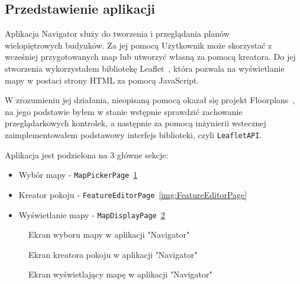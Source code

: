 \subsection{Przedstawienie aplikacji}

Aplikacja Navigator służy do tworzenia i przeglądania planów\\%
wielopiętrowych budynków.
Za jej pomocą Użytkownik może skorzystać z wcześniej przygotowanych map lub utworzyć własną za pomocą kreatora.
Do jej stworzenia wykorzystałem bibliotekę Leaflet~\cite{leafletGithub}, 
która pozwala na wyświetlanie mapy w postaci strony HTML za pomocą JavaScript.

W zrozumieniu jej działania, nieopisaną pomocą okazał się projekt Floorplans~\cite{floorplansGithub},
na jego podstawie byłem w stanie wstępnie sprawdzić zachowanie przeglądarkowych kontrolek, 
a następnie za pomocą inżynierii wstecznej zaimplementowałem podstawowy interfejs biblioteki, 
czyli \verb|LeafletAPI|.

Aplikacja jest podzielona na 3 główne sekcje: 
\begin{itemize}
    \item Wybór mapy - \verb|MapPickerPage|~\ref{img:MapPickerPage}
    \item Kreator pokoju - \verb|FeatureEditorPage|~\ref{img:FeatureEditorPage}
    \item Wyświetlanie mapy - \verb|MapDisplayPage|~\ref{img:MapDisplayPage}
\end{itemize}

\begin{figure}[h]
    \centering
    \caption{Ekran wyboru mapy w aplikacji "Navigator"}
    \label{img:MapPickerPage}
\end{figure}

\begin{figure}[ht]
    \centering
    \begin{minipage}[b]{0.6\textwidth}
      \caption{Ekran kreatora pokoju w aplikacji "Navigator"}
      \label{img:FeatureEditorPage}
    \end{minipage}
    \hfill
    \begin{minipage}[b]{0.39\textwidth}
        \caption{Ekran wyświetlający mapę w aplikacji "Navigator"}
        \label{img:MapDisplayPage}
    \end{minipage}
\end{figure}
